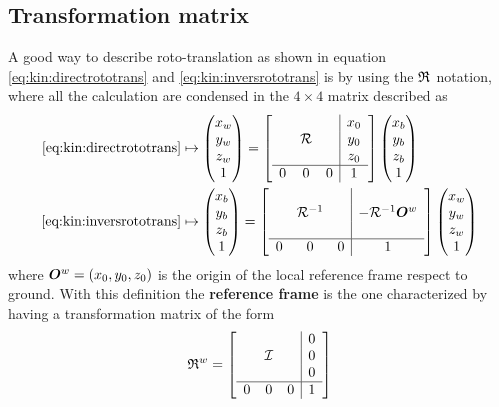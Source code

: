 	\subsection{Transformation matrix}
		A good way to describe roto-translation as shown in equation \ref{eq:kin:directrototrans} and \ref{eq:kin:inversrototrans} is by using the  $\mathfrak {R}_{}$ notation, where all the calculation are condensed in the $4\times 4$ matrix described as
		\begin{equation}
		\begin{aligned}
			\ref{eq:kin:directrototrans} & \mapsto \begin{pmatrix} x_w \\ y_w \\ z_w \\ 1 \end{pmatrix} = \begin{bmatrix}  \begin{array}{c c c | c}
					&&& x_0 \\
					&\mathcal R&& y_0 \\
					&&& z_0 \\ \hline
					0&0&0&1
			\end{array} \end{bmatrix} \begin{pmatrix} x_b \\ y_b \\ z_b \\ 1 \end{pmatrix} \\
			\ref{eq:kin:inversrototrans} & \mapsto \begin{pmatrix} x_b \\ y_b \\ z_b \\ 1 \end{pmatrix} = \begin{bmatrix}  \begin{array}{c c c | c}
				&&& \\
				&\mathcal R^{-1}&& -\mathcal R^{-1} \boldsymbol{O}^w \\
				&&& \\ \hline
				0&0&0&1
		\end{array} \end{bmatrix} \begin{pmatrix} x_w \\ y_w \\ z_w\\ 1 \end{pmatrix}
		\end{aligned}
		\end{equation}
		where $\boldsymbol{O}^w = (x_0,y_0,z_0)$ is the origin of the local reference frame respect to ground. With this definition the \textbf{reference frame} is the one characterized by having a transformation matrix of the form
		\[ \mathfrak {R}_{}^w = \begin{bmatrix}  \begin{array}{c c c | c}
				&&&0 \\
				&\mathcal I&& 0 \\
				&&& 0\\ \hline
				0&0&0&1
		\end{array} \end{bmatrix} \]
		
